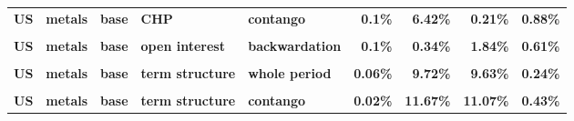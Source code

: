 \documentclass[
  authoryear,
  preprint,
  3p]{elsarticle}
\begin{document}
\begin{landscape}
\begin{longtable}[t]{>{}l>{}l>{}l>{}l>{}l>{}r>{}r>{}r>{}r}
\addlinespace
\textbf{US} & \textbf{metals} & \textbf{base} & \textbf{CHP} & \textbf{contango} & \textcolor[HTML]{4285f4}{\textbf{0.1\%}} & \textcolor[HTML]{4285f4}{\textbf{6.42\%}} & \textcolor[HTML]{4285f4}{\textbf{0.21\%}} & \textcolor[HTML]{4285f4}{\textbf{0.88\%}}\\
\textbf{\cellcolor{gray!10}{US}} & \textbf{\cellcolor{gray!10}{metals}} & \textbf{\cellcolor{gray!10}{base}} & \textbf{\cellcolor{gray!10}{open interest}} & \textbf{\cellcolor{gray!10}{whole period}} & \textcolor[HTML]{4285f4}{\textbf{\cellcolor{gray!10}{0.18\%}}} & \textcolor[HTML]{4285f4}{\textbf{\cellcolor{gray!10}{1.01\%}}} & \textcolor[HTML]{4285f4}{\textbf{\cellcolor{gray!10}{2.78\%}}} & \textcolor[HTML]{4285f4}{\textbf{\cellcolor{gray!10}{0.46\%}}}\\
\textbf{US} & \textbf{metals} & \textbf{base} & \textbf{open interest} & \textbf{backwardation} & \textcolor[HTML]{4285f4}{\textbf{0.1\%}} & \textcolor[HTML]{4285f4}{\textbf{0.34\%}} & \textcolor[HTML]{4285f4}{\textbf{1.84\%}} & \textcolor[HTML]{4285f4}{\textbf{0.61\%}}\\
\textbf{\cellcolor{gray!10}{US}} & \textbf{\cellcolor{gray!10}{metals}} & \textbf{\cellcolor{gray!10}{base}} & \textbf{\cellcolor{gray!10}{open interest}} & \textbf{\cellcolor{gray!10}{contango}} & \textcolor[HTML]{4285f4}{\textbf{\cellcolor{gray!10}{0.24\%}}} & \textcolor[HTML]{4285f4}{\textbf{\cellcolor{gray!10}{1.82\%}}} & \textcolor[HTML]{4285f4}{\textbf{\cellcolor{gray!10}{3.42\%}}} & \textcolor[HTML]{4285f4}{\textbf{\cellcolor{gray!10}{0.37\%}}}\\
\textbf{US} & \textbf{metals} & \textbf{base} & \textbf{term structure} & \textbf{whole period} & \textcolor[HTML]{4285f4}{\textbf{0.06\%}} & \textcolor[HTML]{4285f4}{\textbf{9.72\%}} & \textcolor[HTML]{4285f4}{\textbf{9.63\%}} & \textcolor[HTML]{4285f4}{\textbf{0.24\%}}\\
\addlinespace
\textbf{\cellcolor{gray!10}{US}} & \textbf{\cellcolor{gray!10}{metals}} & \textbf{\cellcolor{gray!10}{base}} & \textbf{\cellcolor{gray!10}{term structure}} & \textbf{\cellcolor{gray!10}{backwardation}} & \textcolor[HTML]{4285f4}{\textbf{\cellcolor{gray!10}{0.37\%}}} & \textcolor[HTML]{4285f4}{\textbf{\cellcolor{gray!10}{7.74\%}}} & \textcolor[HTML]{4285f4}{\textbf{\cellcolor{gray!10}{7.44\%}}} & \textcolor[HTML]{4285f4}{\textbf{\cellcolor{gray!10}{0.12\%}}}\\
\textbf{US} & \textbf{metals} & \textbf{base} & \textbf{term structure} & \textbf{contango} & \textcolor[HTML]{4285f4}{\textbf{0.02\%}} & \textcolor[HTML]{4285f4}{\textbf{11.67\%}} & \textcolor[HTML]{4285f4}{\textbf{11.07\%}} & \textcolor[HTML]{4285f4}{\textbf{0.43\%}}\\

\end{longtable}
\end{landscape}
\end{document}
